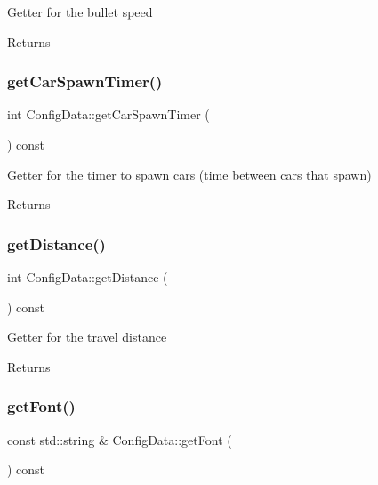 Getter for the bullet speed \begin{DoxyReturn}{Returns}

\end{DoxyReturn}
\mbox{\label{classConfigData_a482dbfc0bae40a9b690bdcafc9de1e9a}} 
\subsubsection{\texorpdfstring{get\+Car\+Spawn\+Timer()}{getCarSpawnTimer()}}
{\footnotesize\ttfamily int Config\+Data\+::get\+Car\+Spawn\+Timer (\begin{DoxyParamCaption}{ }\end{DoxyParamCaption}) const}

Getter for the timer to spawn cars (time between cars that spawn) \begin{DoxyReturn}{Returns}

\end{DoxyReturn}
\mbox{\label{classConfigData_ad815c66b9580b9a8bc4eda6ce2cb0e80}} 
\subsubsection{\texorpdfstring{get\+Distance()}{getDistance()}}
{\footnotesize\ttfamily int Config\+Data\+::get\+Distance (\begin{DoxyParamCaption}{ }\end{DoxyParamCaption}) const}

Getter for the travel distance \begin{DoxyReturn}{Returns}

\end{DoxyReturn}
\mbox{\label{classConfigData_a2ebc3e9c59f5d799cc241c528a2a90b1}} 
\subsubsection{\texorpdfstring{get\+Font()}{getFont()}}
{\footnotesize\ttfamily const std\+::string \& Config\+Data\+::get\+Font (\begin{DoxyParamCaption}{ }\end{DoxyParamCaption}) const}

